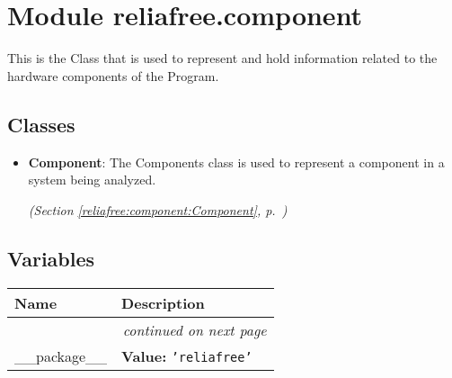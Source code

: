 %
%
%


\section{Module reliafree.component}

    \label{reliafree:component}
This is the Class that is used to represent and hold information related to
the hardware components of the Program.



\subsection{Classes}

\begin{itemize}  \setlength{\parskip}{0ex}
  \item \textbf{Component}: The Components class is used to represent a component in a system being 
analyzed.



  \textit{(Section \ref{reliafree:component:Component}, p.~\pageref{reliafree:component:Component})}

\end{itemize}


  \subsection{Variables}

    \vspace{-1cm}
\hspace{\varindent}\begin{longtable}{|p{\varnamewidth}|p{\vardescrwidth}|l}
\cline{1-2}
\cline{1-2} \centering \textbf{Name} & \centering \textbf{Description}& \\
\cline{1-2}
\endhead\cline{1-2}\multicolumn{3}{r}{\small\textit{continued on next page}}\\\endfoot\cline{1-2}
\endlastfoot\raggedright \_\-\_\-p\-a\-c\-k\-a\-g\-e\-\_\-\_\- & \raggedright \textbf{Value:} 
{\tt \texttt{'}\texttt{reliafree}\texttt{'}}&\\
\cline{1-2}
\end{longtable}

